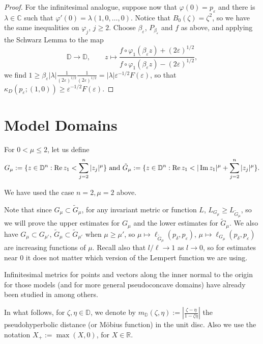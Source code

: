 \documentclass[a4paper,12pt]{amsart}
\def\D{\mathbb D}
\def\C{\mathbb C}
\def\R{\mathbb R}
\renewcommand{\Im}{\operatorname{\rm{Im}}}
\renewcommand{\Re}{\operatorname{\rm{Re}}}
\newcommand{\eps}{\varepsilon}
\begin{document}
\begin{proof}
\smallskip

For the infinitesimal analogue, suppose now that $\varphi(0)=p_\eps$
and there is $\lambda \in \C$ such that $\varphi'(0)=\lambda (1,0,\dots,0)$.
Notice that $B_0(\zeta)=\zeta^2$, so we have the same inequalities on
$\varphi_j$, $j\ge 2$. Choose $\beta_\eps$, $P_{\beta_\eps}$ and $f$ as above,
and applying the Schwarz Lemma to the map
\[
\D \longrightarrow \D, \qquad 
z\mapsto \frac{f\circ \varphi_1 (\beta_\eps z) + (2\eps)^{1/2}}{f\circ \varphi_1 (\beta_\eps z) - (2\eps)^{1/2}},
\]
we find $1 \ge \beta_\eps |\lambda| \frac{1}{(2\eps)^{1/2}} \frac{1}{(2\eps)^{1/2}}= |\lambda| \eps^{-1/2} F(\eps)$, so that $\kappa_D (p_\eps; (1,0))\ge  \eps^{-1/2} F(\eps)$.
\end{proof}


\section{Model Domains}
\label{model}

For $0<\mu \le 2$, let us define
\begin{equation}
\label{defG}
G_\mu := \{z\in \D^n: \Re z_1 < \sum_{j=2}^n |z_j|^\mu \} \mbox{ and } 
\tilde G_\mu := \{z\in \D^n: \Re z_1 < | \Im z_1|^\mu + \sum_{j=2}^n |z_j|^\mu \}.
\end{equation}

We have used the case $n=2, \mu=2$ above.

Note that since $G_\mu \subset \tilde G_\mu $, for any invariant metric or function $L$, $L_{G_\mu} \ge L_{\tilde G_\mu}$, so
we will prove the upper estimates for $G_\mu$ and the lower estimates for $\tilde G_\mu$. We also
have $G_\mu \subset G_{\mu'} $, $\tilde G_\mu \subset \tilde G_{\mu'} $ when ${\mu} \ge {\mu'}$,
so $\mu \mapsto \ell_{\tilde G_\mu}(p_\delta, p_\eps)$, $\mu \mapsto \ell_{G_\mu}(p_\delta, p_\eps)$
are increasing functions of $\mu$. Recall also that 
$l/\ell \to 1$ as $l\to 0$, so for estimates near $0$ it does not matter which version of the Lempert function we are using.

Infinitesimal metrics for points and vectors along the inner normal to the origin
for those models (and for more general pseudoconcave domains) have already been studied in \cite{DNT, FL, Fu1, Fu2} among others.

In what follows, for $\zeta, \eta \in \D$, we denote by $m_{\D} (\zeta, \eta):=\left| \frac{\zeta-\eta}{1-\zeta \bar \eta} \right|$
the pseudohyperbolic distance (or M\"obius function) in the unit disc. Also we use the notation $X_+:= \max(X,0)$, for $X\in \R$.
\end{document}
